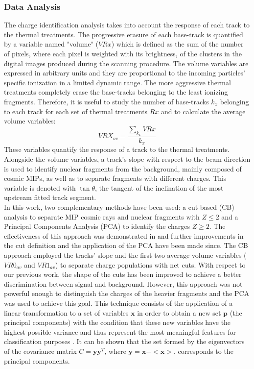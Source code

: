\documentclass[utf8]{frontiersFPHY} %
\begin{document}
\subsubsection{Data Analysis}
The charge identification analysis takes into account the response of each track to the thermal treatments. The progressive erasure of each base-track is quantified by a variable named "volume" ($VRx$) which is defined as the sum of the number of pixels, where each pixel is weighted with its brightness, of the clusters in the digital images produced during the scanning procedure. The volume variables are expressed in arbitrary units and they are proportional to the incoming particles' specific ionization in a limited dynamic range. The more aggressive thermal treatments completely erase the base-tracks belonging to the least ionizing fragments. Therefore, it is useful to study the number of base-tracks $k_{x}$ belonging to each track for each set of thermal treatments $Rx$ and to calculate the average volume variables:
$$ VRX_{av} = \frac{\sum_{k_{x}} VRx} {k_{x}}$$
These variables quantify the response of a track to the thermal treatments. Alongside the volume variables, a track's slope with respect to the beam direction is used to identify nuclear fragments from the background, mainly composed of cosmic MIPs, as well as to separate fragments with different charges. This variable is denoted with $\tan{\theta}$, the tangent of the inclination of the most upstream fitted track segment. \\
In this work, two complementary methods have been used: a cut-based (CB) analysis to separate MIP cosmic rays and nuclear fragments with $Z\leq2$ and a Principal Components Analysis (PCA) to identify the charges $Z\geq2$. The effectiveness of this approach was demonstrated in \cite{Galati2021} and further improvements in the cut definition and the application of the PCA have been made since.
The CB approach employed the tracks' slope and the first two average volume variables ($VR0_{av}$ and $VR1_{av}$) to separate charge populations with net cuts. With respect to our previous work, the shape of the cuts has been improved to achieve a better discrimination between signal and background. However, this approach was not powerful enough to distinguish the charges of the heavier fragments and the PCA was used to achieve this goal. This technique consists of the application of a linear transformation to a set of variables $\textbf{x}$ in order to obtain a new set $\textbf{p}$ (the principal components) with the condition that these new variables have the highest possible variance and thus represent the most meaningful features for classification purposes \cite{PCA}. It can be shown that the set formed by the eigenvectors of the covariance matrix $C = \textbf{y}\textbf{y}^{T}$, where $\textbf{y} = \textbf{x} - <\textbf{x}>$, corresponds to the principal components. 
\end{document}
